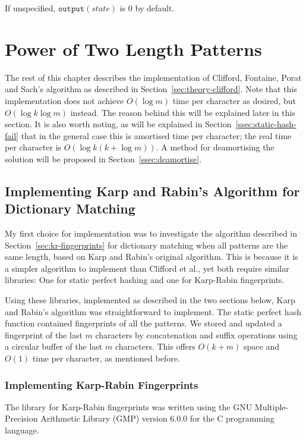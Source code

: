 \documentclass[ %
                    author={Dominic Joseph Moylett},
                    degree={MEng},
                     title={Dictionary Matching with Fingerprints},
                  subtitle={An Empirical Analysis},
                      type={research},
                      year={2015} ]{dissertation}
\begin{document}
If unspecified, $\texttt{output}(state)$ is 0 by default.

\section{Power of Two Length Patterns}

The rest of this chapter describes the implementation of Clifford, Fontaine, Porat and Sach's \cite{2015arXiv150406242C} algorithm as described in Section~\ref{sec:theory-clifford}. Note that this implementation does not achieve $O(\log m)$ time per character as desired, but $O(\log k\log m)$ instead. The reason behind this will be explained later in this section. It is also worth noting, as will be explained in Section~\ref{ssec:static-hash-fail} that in the general case this is amortised time per character; the real time per character is $O(\log k(k + \log m))$. A method for deamortising the solution will be proposed in Section~\ref{ssec:deamortise}.

\subsection{Implementing Karp and Rabin's Algorithm for Dictionary Matching}

My first choice for implementation was to investigate the algorithm described in Section~\ref{sec:kr-fingerprints} for dictionary matching when all patterns are the same length, based on Karp and Rabin's original algorithm. This is because it is a simpler algorithm to implement than Clifford et al., yet both require similar libraries: One for static perfect hashing and one for Karp-Rabin fingerprints.

Using these libraries, implemented as described in the two sections below, Karp and Rabin's algorithm was straightforward to implement. The static perfect hash function contained fingerprints of all the patterns. We stored and updated a fingerprint of the last $m$ characters by concatenation and suffix operations using a circular buffer of the last $m$ characters. This offers $O(k + m)$ space and $O(1)$ time per character, as mentioned before.

\subsubsection{Implementing Karp-Rabin Fingerprints}
\label{sssec:kr-implementation}

The library for Karp-Rabin fingerprints was written using the GNU Multiple-Precision Arithmetic Library (GMP) version 6.0.0 for the C programming language.
\end{document}

